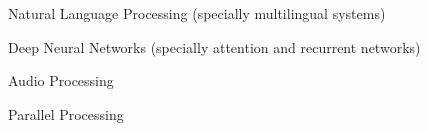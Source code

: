 

\begin{cventries}

\vspace{5mm}

  \begin{cvitems} %
    \item {Natural Language Processing (specially multilingual systems)}
    \item {Deep Neural Networks (specially attention and recurrent networks)}
    \item {Audio Processing}
    \item {Parallel Processing}
   \end{cvitems}
    
\end{cventries}
